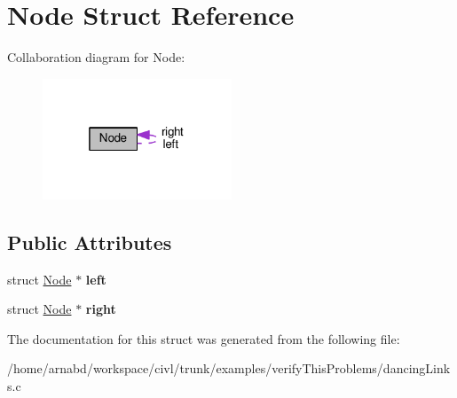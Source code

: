 \hypertarget{structNode}{}\section{Node Struct Reference}
\label{structNode}


Collaboration diagram for Node\+:
\nopagebreak
\begin{figure}[H]
\begin{center}
\leavevmode
\includegraphics[width=160pt]{structNode__coll__graph}
\end{center}
\end{figure}
\subsection*{Public Attributes}
\begin{DoxyCompactItemize}
\item 
\hypertarget{structNode_ad0976834843c7618677d22a10c495b36}{}struct \hyperlink{structNode}{Node} $\ast$ {\bfseries left}\label{structNode_ad0976834843c7618677d22a10c495b36}

\item 
\hypertarget{structNode_af99e7102380da88d7c079fa264230cf4}{}struct \hyperlink{structNode}{Node} $\ast$ {\bfseries right}\label{structNode_af99e7102380da88d7c079fa264230cf4}

\end{DoxyCompactItemize}


The documentation for this struct was generated from the following file\+:\begin{DoxyCompactItemize}
\item 
/home/arnabd/workspace/civl/trunk/examples/verify\+This\+Problems/dancing\+Links.\+c\end{DoxyCompactItemize}
